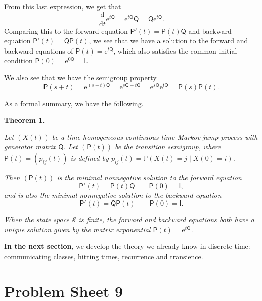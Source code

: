 \documentclass[
  a4paper,
]{article}
\newif\ifcomm\commtrue
\newtheorem{theorem}{Theorem}[section]
\theoremstyle{definition}
\theoremstyle{definition}
\theoremstyle{definition}
\theoremstyle{remark}
\begin{document}
From this last expression, we get that
\[ \frac{\mathrm d}{\mathrm d t} \mathrm{e}^{t{\mathsf Q}} = \mathrm{e}^{t{\mathsf Q}} {\mathsf Q} = {\mathsf Q} \mathrm{e}^{t{\mathsf Q}}  . \]
Comparing this to the forward equation \(\mathsf P'(t) = \mathsf{P}(t) \mathsf Q\) and backward equation \(\mathsf{P}'(t) = \mathsf Q \mathsf{P}(t)\), we see that we have a solution to the forward and backward equations of \(\mathsf P(t) = \mathrm{e}^{t\mathsf Q}\), which also satisfies the common initial condition \(\mathsf P(0) = \mathrm{e}^{0\mathsf Q} = \mathsf I\).

We also see that we have the semigroup property
\[ \mathsf P(s+t) = \mathrm{e}^{(s+t)\mathsf Q} = \mathrm{e}^{s \mathsf Q + t \mathsf Q} = \mathrm{e}^{s \mathsf Q}\mathrm{e}^{t \mathsf Q} = \mathsf P(s) \mathsf P(t) . \]

As a formal summary, we have the following.

\begin{theorem}
\protect\hypertarget{thm:exp-thm}{}\label{thm:exp-thm}

Let \((X(t))\) be a time homogeneous continuous time Markov jump process with generator matrix \(\mathsf Q\). Let \((\mathsf P(t))\) be the transition semigroup, where \(\mathsf P(t) = (p_{ij}(t))\) is defined by \(p_{ij}(t) = \mathbb P(X(t) = j \mid X(0) = i)\).

Then \((\mathsf P(t))\) is the minimal nonnegative solution to the forward equation
\[ \mathsf P'(t) = \mathsf P(t) \mathsf Q \qquad \mathsf P(0) = \mathsf I , \]
and is also the minimal nonnegative solution to the backward equation
\[ \mathsf P'(t) = \mathsf Q \mathsf P(t) \qquad \mathsf P(0) = \mathsf I . \]

When the state space \(\mathcal S\) is finite, the forward and backward equations both have a unique solution given by the matrix exponential \(\mathsf P(t) = \mathrm{e}^{t \mathsf Q}\).

\end{theorem}

\textbf{In the next section}, we develop the theory we already know in discrete time: communicating classes, hitting times, recurrence and transience.

\hypertarget{P09}{%
\section*{Problem Sheet 9}\label{P09}}

\commtrue
\end{document}
